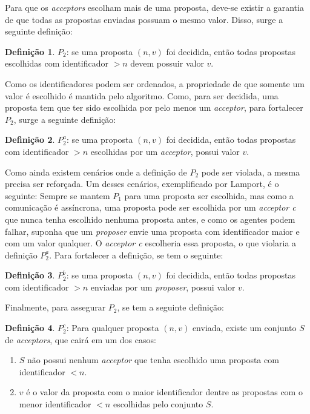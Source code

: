 \documentclass[
    12pt,
    openright, 
    oneside,
    a4paper,
    french,
    english,
    brazil
    ]{facom-ufu-abntex2}
\theoremstyle{definition}
\newtheorem{definition}{Definição}
\begin{document}
Para que os \textit{acceptors} escolham mais de uma proposta, deve-se existir a garantia de
que todas as propostas enviadas possuam o mesmo valor. Disso, surge a seguinte definição:

\begin{definition}
$P_2$: se uma proposta $(n, v)$ foi decidida, então todas propostas escolhidas com 
identificador $>n$ devem possuir valor $v$.
\end{definition}

Como os identificadores podem ser ordenados, a propriedade de que somente um valor é escolhido
é mantida pelo algoritmo. Como, para ser decidida, uma proposta tem que ter sido escolhida
por pelo menos um \textit{acceptor}, para fortalecer $P_2$, surge a seguinte definição:

\begin{definition}
$P_2^a$: se uma proposta $(n, v)$ foi decidida, então todas propostas com identificador
$>n$ escolhidas por um \textit{acceptor}, possui valor $v$.
\end{definition}

Como ainda existem cenários onde a definição de $P_2$ pode ser violada, a mesma precisa ser
reforçada. Um desses cenários, exemplificado por Lamport, é o seguinte:
Sempre se mantem $P_1$ para uma proposta ser escolhida, mas como
a comunicação é assíncrona, uma proposta pode ser escolhida por um \textit{acceptor c} 
que nunca tenha escolhido nenhuma proposta antes, e como os agentes podem falhar, suponha
que um \textit{proposer} envie uma proposta com identificador maior e com um valor qualquer.
O \textit{acceptor c} escolheria essa proposta, o que violaria a definição $P_2^a$. Para
fortalecer a definição, se tem o seguinte:

\begin{definition}
$P_2^b$: se uma proposta $(n, v)$ foi decidida, então todas propostas com identificador
$>n$ enviadas por um \textit{proposer}, possui valor $v$.
\end{definition}

Finalmente, para assegurar $P_2$, se tem a seguinte definição:

\begin{definition}
$P_2^c$: Para qualquer proposta $(n, v)$ enviada, existe um conjunto $S$ de
\textit{acceptors}, que cairá em um dos casos:

\begin{enumerate}
    \item $S$ não possui nenhum \textit{acceptor} que tenha escolhido uma proposta com 
identificador $<n$.

    \item $v$ é o valor da proposta com o maior identificador dentre as propostas com o 
menor identificador $<n$ escolhidas pelo conjunto $S$.
\end{enumerate}
\end{definition}
\end{document}
